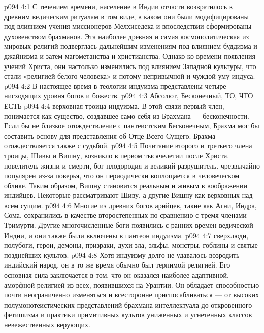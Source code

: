 \vs p094 4:1 С течением времени, население в Индии отчасти возвратилось к древним ведическим ритуалам в том виде, в каком они были модифицированы под влиянием учения миссионеров Мелхиседека и впоследствии сформированы духовенством брахманов. Эта наиболее древняя и самая космополитическая из мировых религий подверглась дальнейшим изменениям под влиянием буддизма и джайнизма и затем магометанства и христианства. Однако ко времени появления учений Христа, они настолько изменились под влиянием Западной культуры, что стали «религией белого человека» и потому непривычной и чуждой уму индуса.
\vs p094 4:2 \pc В настоящее время в теологии индуизма представлены четыре нисходящих уровня богов и божеств.
\vs p094 4:3 \bibnobreakspace {} Абсолют, Бесконечный, ТО, ЧТО ЕСТЬ
\vs p094 4:4 \pc {}\bibnobreakspace {} верховная троица индуизма. В этой связи первый член,  понимается как существо, создавшее само себя из Брахмана --- бесконечности. Если бы не близкое отождествление с пантеистским Бесконечным, Брахма мог бы составить основу для представления об Отце Всего Сущего. Брахма отождествляется также с судьбой.
\vs p094 4:5 Почитание второго и третьего члена троицы, Шивы и Вишну, возникло в первом тысячелетии после Христа.  повелитель жизни и смерти, бог плодородия и великий разрушитель.  чрезвычайно популярен из\hyp{}за поверья, что он периодически воплощается в человеческом облике. Таким образом, Вишну становится реальным и живым в воображении индийцев. Некоторые рассматривают Шиву, а другие Вишну как верховных над всем сущим.
\vs p094 4:6 \pc {}\bibnobreakspace {} Многие из древних богов арийцев, такие как Агни, Индра, Сома, сохранились в качестве второстепенных по сравнению с тремя членами Тримурти. Другие многочисленные боги появились с ранних времен ведической Индии, и они также были включены в пантеон индуизма.
\vs p094 4:7 \pc {}\bibnobreakspace {} сверхлюди, полубоги, герои, демоны, призраки, духи зла, эльфы, монстры, гоблины и святые позднейших культов.
\vs p094 4:8 \pc Хотя индуизму долго не удавалось возродить индийский народ, он в то же время обычно был терпимой религией. Его основная сила заключается в том, что он оказался наиболее адаптивной, аморфной религией из всех, появившихся на Урантии. Он обладает способностью почти неограниченно изменяться и всесторонне приспосабливаться --- от высоких полумонотеистических представлений брахмана\hyp{}интеллектуала до откровенного фетишизма и практики примитивных культов униженных и угнетенных классов невежественных верующих.
